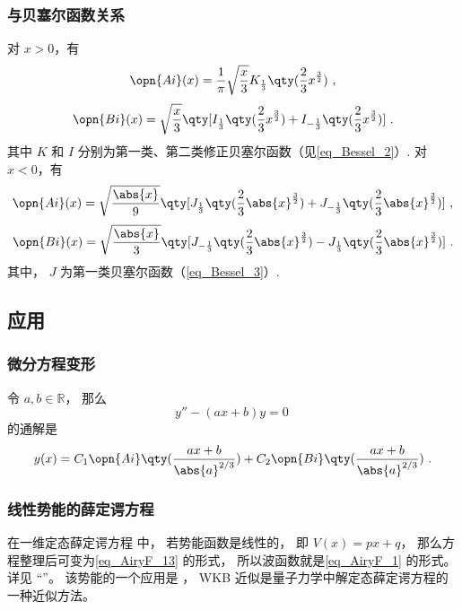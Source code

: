 \subsubsection{与贝塞尔函数关系}
对 $x>0$，有
\begin{equation}
\opn{Ai}(x)=\frac1\pi \sqrt{\frac x3} K_{\frac13} \qty(\frac23 x^{\frac32})~,
\end{equation}\begin{equation}
\opn{Bi}(x)=\sqrt{\frac x3} \qty[I_{\frac13}\qty(\frac23 x^{\frac32})+I_{-\frac13}\qty(\frac23 x^{\frac32})]~.
\end{equation}
其中 $K$ 和 $I$ 分别为第一类、第二类修正贝塞尔函数（见\autoref{eq_Bessel_2}）.
对 $x<0$，有
\begin{equation}
\opn{Ai}(x)=\sqrt{\frac{\abs{x}}{9}}\qty[J_{\frac13}\qty(\frac23 \abs{x}^{\frac32})+J_{-\frac13}\qty(\frac23 \abs{x}^{\frac32})]~,
\end{equation}
\begin{equation}
\opn{Bi}(x)=\sqrt{\frac{\abs{x}}{3}} \qty[J_{-\frac13}\qty(\frac23 \abs{x}^{\frac32})-J_{\frac13}\qty(\frac23 \abs{x}^{\frac32})]~.
\end{equation}
其中， $J$ 为第一类贝塞尔函数（\autoref{eq_Bessel_3}）.

\subsection{应用}
\subsubsection{微分方程变形}
令 $a, b\in \mathbb R$， 那么
\begin{equation}\label{eq_AiryF_13}
y'' - (ax + b) y = 0~
\end{equation}
的通解是
\begin{equation}\label{eq_AiryF_1}
y(x) = C_1\opn{Ai}\qty(\frac{ax+b}{\abs{a}^{2/3}}) + C_2 \opn{Bi}\qty(\frac{ax+b}{\abs{a}^{2/3}})~.
\end{equation}


\subsubsection{线性势能的薛定谔方程}
在一维定态薛定谔方程%
中， 若势能函数是线性的， 即 $V(x) = px + q$， 那么方程整理后可变为\autoref{eq_AiryF_13} 的形式， 所以波函数就是\autoref{eq_AiryF_1} 的形式。 详见 “”。 该势能的一个应用是 ， WKB 近似是量子力学中解定态薛定谔方程的一种近似方法。
